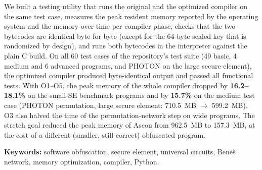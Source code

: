 \documentclass[12pt,a4paper,oneside]{report}
\begin{document}
We built a testing utility that runs the original and the optimized compiler on the same test
case, measures the peak resident memory reported by the operating system and the memory over
time per compiler phase, checks that the two bytecodes are identical byte for byte (except for
the 64-byte sealed key that is randomized by design), and runs both bytecodes in the interpreter
against the plain C build. On all 60 test cases of the repository's test suite (49 basic,
4 medium and 6 advanced programs, and PHOTON on the large secure element), the optimized compiler
produced byte-identical output and passed all functional tests. With O1--O5, the peak memory of
the whole compiler dropped by \textbf{16.2--18.1\%} on the small-SE benchmark programs and by
\textbf{15.7\%} on the medium test case (PHOTON permutation, large secure element:
710.5~MB $\rightarrow$ 599.2~MB). O3 also halved the time of the permutation-network
step on wide programs. The stretch goal reduced the peak memory of Ascon from 962.5~MB to
157.3~MB, at the cost of a different (smaller, still correct) obfuscated program.

\textbf{Keywords:} software obfuscation, secure element, universal circuits, Bene\v{s} network,
memory optimization, compiler, Python.

\clearpage
\pagestyle{plain}
\renewcommand{\contentsname}{Table of Contents}
{\singlespacing\setlength{\cftbeforechapskip}{3pt}\setlength{\cftbeforetoctitleskip}{-20pt}\setlength{\cftaftertoctitleskip}{12pt}\tableofcontents}
\clearpage
\end{document}
